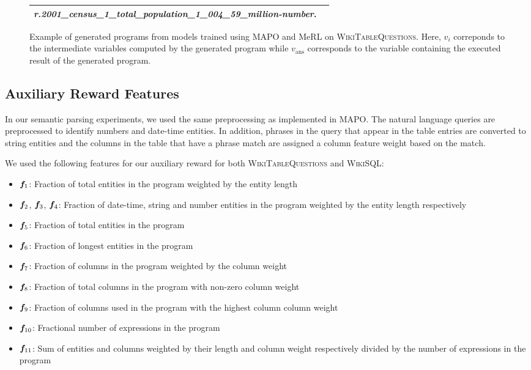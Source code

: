 \begin{figure*}[t]
\begin{center}
\begin{tabular}{@{}lm{\columnwidth}@{}}
	  \textit{r.2001\_census\_1\_total\_population\_1\_004\_59\_million-number}.\\
	\bottomrule
    \end{tabular}
    \caption{Example of generated programs from models trained using MAPO and MeRL on \textsc{WikiTableQuestions}. Here, $v_{i}$ correponds to the intermediate variables computed
    by the generated program while $v_{\mathrm{ans}}$ corresponds to the variable containing the executed result of the generated program.} \label{fig:spurious_examples}
  \end{center}
\vspace{-0.2in}
\end{figure*}

\subsection{Auxiliary Reward Features}
In our semantic parsing experiments, we used the same preprocessing as implemented in MAPO.
The natural language queries are preprocessed to identify numbers and date-time entities. In addition,
phrases in the query that appear in the table entries are converted to string entities and the columns
in the table that have a phrase match are assigned a column feature weight based on the match.

We used the following features for our auxiliary reward for both \textsc{WikiTableQuestions} and \textsc{WikiSQL}:
\begin{itemize}
	\itemsep -0.05em
	\item ${\bm{f}}_1$: Fraction of total entities in the program weighted by the entity length
	\item ${\bm{f}}_2$, ${\bm{f}}_3$, ${\bm{f}}_4$: Fraction of date-time, string and number entities in the program weighted by the entity length respectively
	\item ${\bm{f}}_5$: Fraction of total entities in the program
	\item ${\bm{f}}_6$: Fraction of longest entities in the program
	\item ${\bm{f}}_7$: Fraction of columns in the program weighted by the column weight
	\item ${\bm{f}}_8$: Fraction of total columns in the program with non-zero column weight
	\item ${\bm{f}}_9$: Fraction of columns used in the program with the highest column column weight
	\item ${\bm{f}}_{10}$: Fractional number of expressions in the program
	\item ${\bm{f}}_{11}$: Sum of entities and columns weighted by their length and column weight respectively divided by the number of expressions in the program
\end{itemize}

